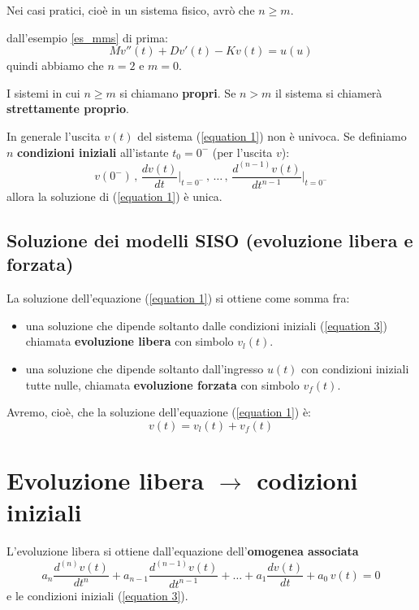 	\begin{osservazione}
		Nei casi pratici, cioè in un sistema fisico, avrò che $n \ge m$.
	\end{osservazione}

	\begin{nexample}
		dall'esempio \ref{es_mms} di prima:
		 \[ M v''(t) + D v'(t) - K v(t) = u(u) \]
		quindi abbiamo che $ n = 2 $ e $ m = 0 $.
	\end{nexample}

	
	\begin{definizione}
		I sistemi in cui $n \ge m$ si chiamano \textbf{propri}.
		Se $n > m$ il sistema si chiamerà \textbf{strettamente proprio}.
	\end{definizione}
	
	\begin{osservazione}
		In generale l'uscita $v(t)$ del sistema (\ref{equation 1}) non è univoca.
		Se definiamo $n$ \textbf{condizioni iniziali} all'istante $t_0 = 0^-$ (per l'uscita $v$):
		\begin{equation}
			v(0^-) \,
			,\, \frac{dv(t)}{dt}\bigg\vert_{t=0^-} \,
			,\, \dots\,
			,\, \frac{d^{(n-1)}v(t)}{dt^{n-1}}\bigg\vert_{t=0^-}
			\tag{3}\label{equation 3}
		\end{equation}
		allora la soluzione di (\ref{equation 1}) è unica.
	\end{osservazione}
	
\subsection{Soluzione dei modelli SISO (evoluzione libera e forzata)}
	
	La soluzione dell'equazione (\ref{equation 1}) si ottiene come somma fra:
	\begin{itemize}
		\item una soluzione che dipende soltanto dalle condizioni iniziali (\ref{equation 3}) chiamata \textbf{evoluzione libera} con simbolo $v_l(t)$.
		\item una soluzione che dipende soltanto dall'ingresso $u(t)$ con condizioni iniziali tutte nulle, chiamata \textbf{ evoluzione forzata} con simbolo $v_f(t)$.
	\end{itemize}
	Avremo, cioè, che la soluzione dell'equazione (\ref{equation 1}) è:\\
	\[
	v(t) = v_l(t) + v_f(t)
	\]
	
\section{Evoluzione libera $ \rightarrow $ codizioni iniziali}
	L'evoluzione libera si ottiene dall'equazione dell'\textbf{omogenea associata}
	\begin{equation}
		a_n \frac{d^{(n)} v(t)}{dt^n} 
			+ a_{n-1} \frac{d^{(n-1)} v(t)}{dt^{n-1}} 
			+ \dots 
			+ a_1 \frac{dv(t)}{dt} 
			+ a_0\,v(t)
		= 0
		\tag{4}\label{equation 4}
	\end{equation}
	e le condizioni iniziali (\ref{equation 3}).
	
